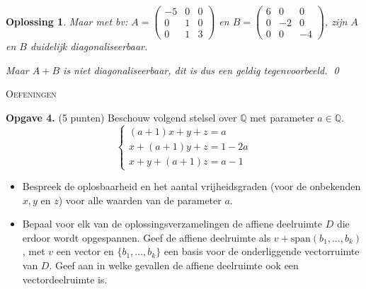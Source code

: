\documentclass[a4paper,12pt]{article}
\newtheorem{oplossing}{Oplossing}
\begin{document}
\begin{enumerate}
\begin{itemize}
\begin{oplossing}
        Maar met bv:
        \(A  = \begin{pmatrix}
            -5 & 0 & 0 \\
            0 & 1 & 0\\
            0 & 1 & 3
        \end{pmatrix}\)
        en
        \( B = \begin{pmatrix}
            6 & 0 & 0 \\
            0 & -2 & 0\\
            0 & 0 & -4
        \end{pmatrix}\),
        zijn \(A\) en \(B\) duidelijk diagonaliseerbaar.

        Maar \(A+B\) is niet diagonaliseerbaar, dit is dus een geldig tegenvoorbeeld. \qed
    \end{oplossing}
\end{itemize}

\newpage

\begin{center}
    \textsc{Oefeningen}
\end{center}


\vspace{0.5cm}

\textbf{Opgave 4.} (5 punten) Beschouw volgend stelsel over $\mathbb{Q}$ met parameter $a \in \mathbb{Q}$.
\[
\begin{cases}
(a + 1)x + y + z = a \\
x + (a + 1)y + z = 1 - 2a \\
x + y + (a + 1)z = a - 1
\end{cases}
\]
\begin{itemize}
    \item[(i)] Bespreek de oplosbaarheid en het aantal vrijheidsgraden (voor de onbekenden $x, y$ en $z$) voor alle waarden van de parameter $a$.
    \item[(ii)] Bepaal voor elk van de oplossingsverzamelingen de affiene deelruimte $D$ die erdoor wordt opgespannen. Geef de affiene deelruimte als $v + \text{span}(b_1, \dots, b_k)$, met $v$ een vector en $\{b_1, \dots, b_k\}$ een basis voor de onderliggende vectorruimte van $D$. Geef aan in welke gevallen de affiene deelruimte ook een vectordeelruimte is.
\end{itemize}

\vspace{0.5cm}



\end{enumerate}
\end{document}
